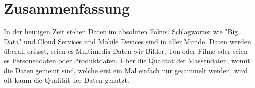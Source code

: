 \chapter*{Zusammenfassung}


In der heutigen Zeit stehen Daten im absoluten Fokus. Schlagwörter wie "Big Data" und Cloud Services und Mobile Devices sind in aller Munde. Daten werden überall erfasst, seien es Multimedia-Daten wie Bilder, Ton oder Filme oder seien es Personendaten oder Produktdaten. Über die Qualität der Massendaten, womit die Daten gemeint sind, welche erst ein Mal einfach nur gesammelt werden, wird oft kaum die Qualität der Daten genutzt.  